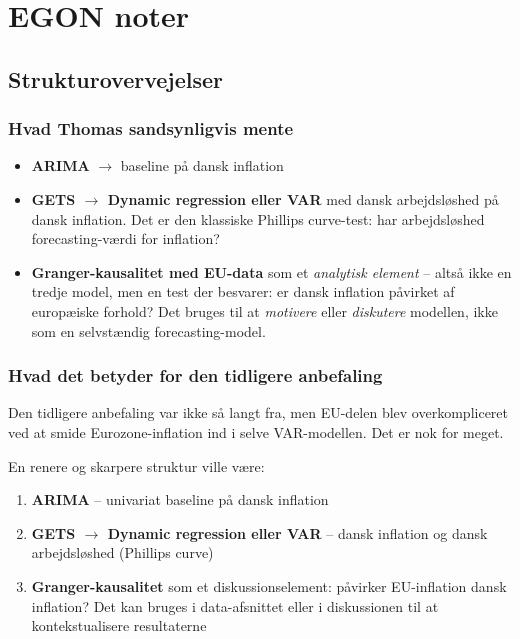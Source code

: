 
\chapter{EGON noter}

\section{Strukturovervejelser}

\subsection{Hvad Thomas sandsynligvis mente}

\begin{itemize}
    \item \textbf{ARIMA} $\rightarrow$ baseline på dansk inflation
    \item \textbf{GETS $\rightarrow$ Dynamic regression eller VAR} med dansk arbejdsløshed på dansk inflation. Det er den klassiske Phillips curve-test: har arbejdsløshed forecasting-værdi for inflation?
    \item \textbf{Granger-kausalitet med EU-data} som et \textit{analytisk element} -- altså ikke en tredje model, men en test der besvarer: er dansk inflation påvirket af europæiske forhold? Det bruges til at \textit{motivere} eller \textit{diskutere} modellen, ikke som en selvstændig forecasting-model.
\end{itemize}

\subsection{Hvad det betyder for den tidligere anbefaling}

Den tidligere anbefaling var ikke så langt fra, men EU-delen blev overkompliceret ved at smide Eurozone-inflation ind i selve VAR-modellen. Det er nok for meget.

En renere og skarpere struktur ville være:

\begin{enumerate}
    \item \textbf{ARIMA} -- univariat baseline på dansk inflation
    \item \textbf{GETS $\rightarrow$ Dynamic regression eller VAR} -- dansk inflation og dansk arbejdsløshed (Phillips curve)
    \item \textbf{Granger-kausalitet} som et diskussionselement: påvirker EU-inflation dansk inflation? Det kan bruges i data-afsnittet eller i diskussionen til at kontekstualisere resultaterne
\end{enumerate}

